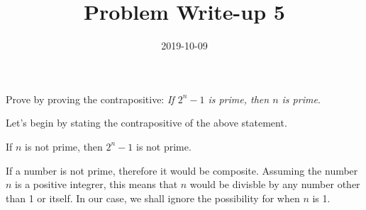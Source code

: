 \documentclass[a4paper,12pt]{article}
\title{Problem Write-up 5}
\date{2019-10-09}
\begin{document}
	\begin{problem}
		Prove by proving the contrapositive: \textit{If \(2^n - 1\) is prime, then \(n\) is prime}.
	\end{problem}
	\begin{answer}
		Let's begin by stating the contrapositive of the above statement.
		\begin{contrapositive}
			If \(n\) is not prime, then \(2^n - 1\) is not prime.
		\end{contrapositive}
		If a number is not prime, therefore it would be composite. Assuming the number \(n\) is a positive integrer, this means that \(n\) would be divisble by any number other than 1 or itself. In our case, we shall ignore the possibility for when \(n\) is 1.
	\end{answer}
\end{document}
